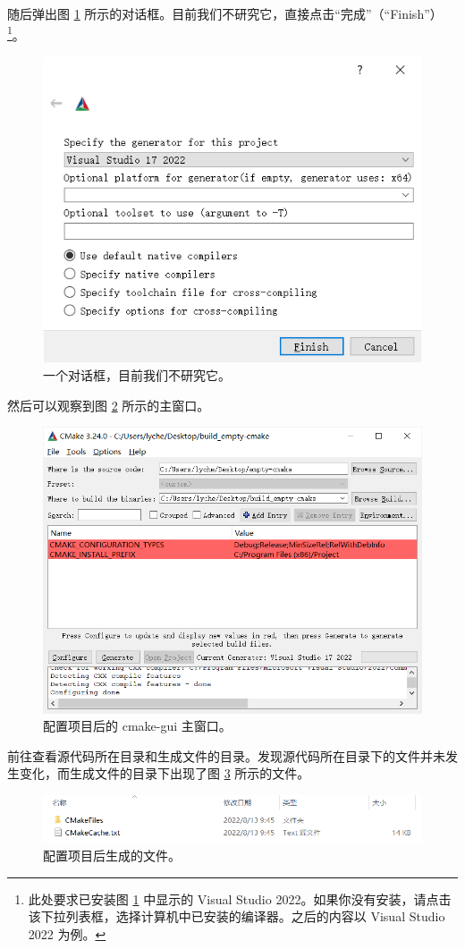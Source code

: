 \begin{enumerate}
	随后弹出图 \ref{fig:empty-cmake-3} 所示的对话框。目前我们不研究它，直接点击“完成”（“Finish”）\footnote{此处要求已安装图 \ref{fig:empty-cmake-3} 中显示的 Visual Studio 2022。如果你没有安装，请点击该下拉列表框，选择计算机中已安装的编译器。之后的内容以 Visual Studio 2022 为例。}。

	\begin{figure}[H]
		\centering
		\includegraphics[width=0.4\linewidth]{assets/empty-cmake-3}
		\caption{一个对话框，目前我们不研究它。}
		\label{fig:empty-cmake-3}
	\end{figure}

	然后可以观察到图 \ref{fig:empty-cmake-4} 所示的主窗口。

	\begin{figure}[H]
		\centering
		\includegraphics[width=0.7\linewidth]{assets/empty-cmake-4}
		\caption{配置项目后的 cmake-gui 主窗口。}
		\label{fig:empty-cmake-4}
	\end{figure}

	前往查看源代码所在目录和生成文件的目录。发现源代码所在目录下的文件并未发生变化，而生成文件的目录下出现了图 \ref{fig:empty-cmake-5} 所示的文件。

	\begin{figure}[H]
		\centering
		\includegraphics[width=0.9\linewidth]{assets/empty-cmake-5}
		\caption{配置项目后生成的文件。}
		\label{fig:empty-cmake-5}
	\end{figure}


\end{enumerate}
